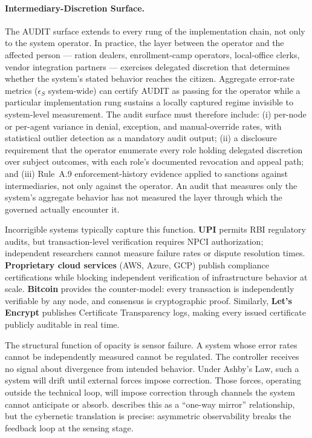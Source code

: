 \documentclass{article}
\begin{document}
\paragraph{Intermediary-Discretion Surface.} The AUDIT surface extends to every rung of the implementation chain, not only to the system operator. In practice, the layer between the operator and the affected person --- ration dealers, enrollment-camp operators, local-office clerks, vendor integration partners --- exercises delegated discretion that determines whether the system's stated behavior reaches the citizen. Aggregate error-rate metrics ($\epsilon_S$ system-wide) can certify AUDIT as passing for the operator while a particular implementation rung sustains a locally captured regime invisible to system-level measurement. The audit surface must therefore include: (i) per-node or per-agent variance in denial, exception, and manual-override rates, with statistical outlier detection as a mandatory audit output; (ii) a disclosure requirement that the operator enumerate every role holding delegated discretion over subject outcomes, with each role's documented revocation and appeal path; and (iii) Rule~A.9 enforcement-history evidence applied to sanctions against intermediaries, not only against the operator. An audit that measures only the system's aggregate behavior has not measured the layer through which the governed actually encounter it.

Incorrigible systems typically capture this function. \textbf{UPI} permits RBI regulatory audits, but transaction-level verification requires NPCI authorization; independent researchers cannot measure failure rates or dispute resolution times. \textbf{Proprietary cloud services} (AWS, Azure, GCP) publish compliance certifications while blocking independent verification of infrastructure behavior at scale. \textbf{Bitcoin} provides the counter-model: every transaction is independently verifiable by any node, and consensus is cryptographic proof. Similarly, \textbf{Let's Encrypt} publishes Certificate Transparency logs, making every issued certificate publicly auditable in real time.

The structural function of opacity is sensor failure. A system whose error rates cannot be independently measured cannot be regulated. The controller receives no signal about divergence from intended behavior. Under Ashby's Law, such a system will drift until external forces impose correction. Those forces, operating outside the technical loop, will impose correction through channels the system cannot anticipate or absorb. \citet{pasquale2015} describes this as a ``one-way mirror'' relationship, but the cybernetic translation is precise: asymmetric observability breaks the feedback loop at the sensing stage.
\end{document}
